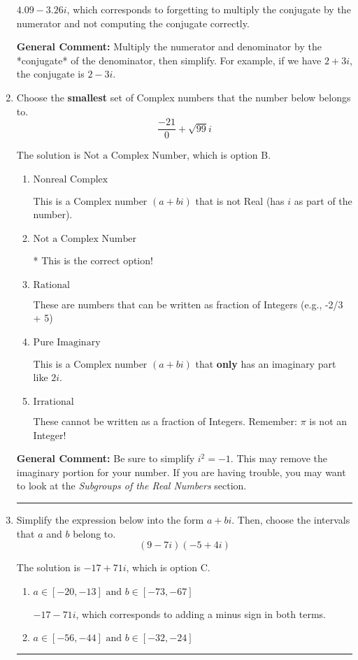 \documentclass{extbook}[14pt]
\newcommand{\litem}[1]{\item #1

\rule{\textwidth}{0.4pt}}
\begin{document}
\begin{enumerate}
{\begin{enumerate}[label=\Alph*.]
 $4.09  - 3.26 i$, which corresponds to forgetting to multiply the conjugate by the numerator and not computing the conjugate correctly.
\end{enumerate}

\textbf{General Comment:} Multiply the numerator and denominator by the *conjugate* of the denominator, then simplify. For example, if we have $2+3i$, the conjugate is $2-3i$.
}
\litem{
Choose the \textbf{smallest} set of Complex numbers that the number below belongs to.
\[ \frac{-21}{0}+\sqrt{99} i \]

The solution is \( \text{Not a Complex Number} \), which is option B.\begin{enumerate}[label=\Alph*.]
\item \( \text{Nonreal Complex} \)

This is a Complex number $(a+bi)$ that is not Real (has $i$ as part of the number).
\item \( \text{Not a Complex Number} \)

* This is the correct option!
\item \( \text{Rational} \)

These are numbers that can be written as fraction of Integers (e.g., -2/3 + 5)
\item \( \text{Pure Imaginary} \)

This is a Complex number $(a+bi)$ that \textbf{only} has an imaginary part like $2i$.
\item \( \text{Irrational} \)

These cannot be written as a fraction of Integers. Remember: $\pi$ is not an Integer!
\end{enumerate}

\textbf{General Comment:} Be sure to simplify $i^2 = -1$. This may remove the imaginary portion for your number. If you are having trouble, you may want to look at the \textit{Subgroups of the Real Numbers} section.
}
\litem{
Simplify the expression below into the form $a+bi$. Then, choose the intervals that $a$ and $b$ belong to.
\[ (9 - 7 i)(-5 + 4 i) \]

The solution is \( -17 + 71 i \), which is option C.\begin{enumerate}[label=\Alph*.]
\item \( a \in [-20, -13] \text{ and } b \in [-73, -67] \)

 $-17 - 71 i$, which corresponds to adding a minus sign in both terms.
\item \( a \in [-56, -44] \text{ and } b \in [-32, -24] \)


\end{enumerate}}
\end{enumerate}
\end{document}

